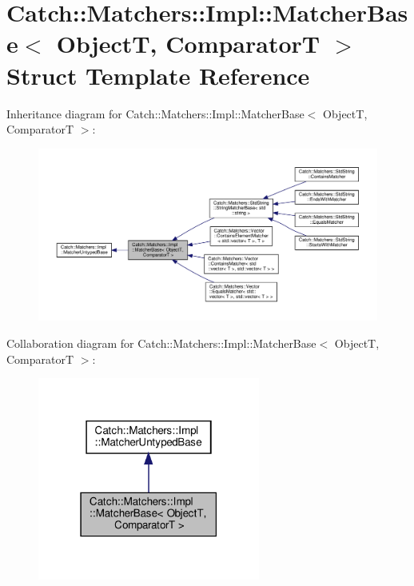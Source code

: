 \hypertarget{structCatch_1_1Matchers_1_1Impl_1_1MatcherBase}{}\section{Catch\+:\+:Matchers\+:\+:Impl\+:\+:Matcher\+Base$<$ ObjectT, ComparatorT $>$ Struct Template Reference}
\label{structCatch_1_1Matchers_1_1Impl_1_1MatcherBase}


Inheritance diagram for Catch\+:\+:Matchers\+:\+:Impl\+:\+:Matcher\+Base$<$ ObjectT, ComparatorT $>$\+:
\nopagebreak
\begin{figure}[H]
\begin{center}
\leavevmode
\includegraphics[width=350pt]{structCatch_1_1Matchers_1_1Impl_1_1MatcherBase__inherit__graph}
\end{center}
\end{figure}


Collaboration diagram for Catch\+:\+:Matchers\+:\+:Impl\+:\+:Matcher\+Base$<$ ObjectT, ComparatorT $>$\+:
\nopagebreak
\begin{figure}[H]
\begin{center}
\leavevmode
\includegraphics[width=207pt]{structCatch_1_1Matchers_1_1Impl_1_1MatcherBase__coll__graph}
\end{center}
\end{figure}
